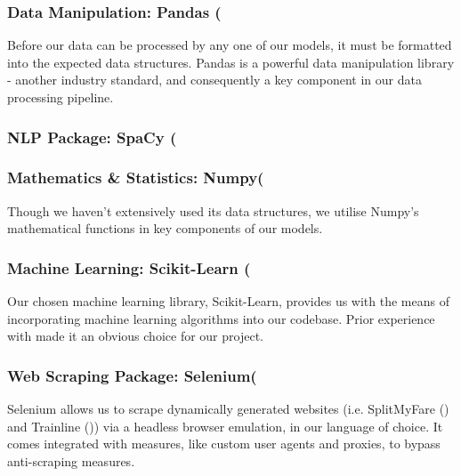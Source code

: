 \documentclass[11pt]{article}
\begin{document}
\subsubsection{Data Manipulation: Pandas (\texorpdfstring{\cite{pandas}})} \label{pandas}
Before our data can be processed by any one of our models, it must be formatted into the expected data structures. Pandas is a powerful data manipulation library - another industry standard, and consequently a key component in our data processing pipeline.

\subsubsection{NLP Package: SpaCy (\texorpdfstring{\cite{spacy}})} \label{spacy}


\subsubsection{Mathematics \& Statistics: Numpy(\texorpdfstring{\cite{numpy}})} \label{numpy}
Though we haven't extensively used its data structures, we utilise Numpy's mathematical functions in key components of our models. 

\subsubsection{Machine Learning: Scikit-Learn (\texorpdfstring{\cite{scikitlearn}})} \label{scikitlearn}
Our chosen machine learning library, Scikit-Learn, provides us with the means of incorporating machine learning algorithms into our codebase. Prior experience with made it an obvious choice for our project.

\subsubsection{Web Scraping Package: Selenium(\texorpdfstring{\cite{selenium}})} \label{selenium}
Selenium allows us to scrape dynamically generated websites (i.e. SplitMyFare (\cite {splitmyfare}) and Trainline (\cite{trainline})) via a headless browser emulation, in our language of choice. It comes integrated with measures, like custom user agents and proxies, to bypass anti-scraping measures.




\end{document}
